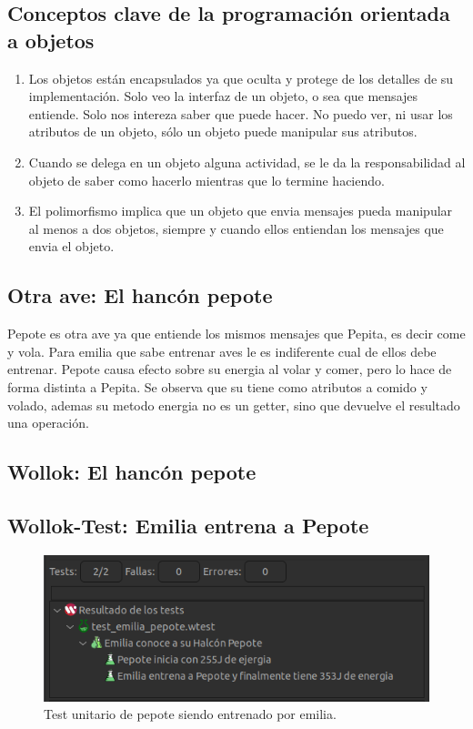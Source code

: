 \documentclass[11pt,a4paper]{article}
\begin{document}
\subsection{Conceptos clave de la programación orientada a objetos}
\begin{enumerate}
	\item Los objetos están encapsulados ya que oculta y protege de los detalles de su implementación. Solo veo la interfaz de un objeto, o sea que mensajes entiende. Solo nos intereza saber que puede hacer. No puedo ver, ni usar los atributos de un objeto, sólo un objeto puede manipular sus atributos.
	\item Cuando se delega en un objeto alguna actividad, se le da la responsabilidad al objeto de saber como hacerlo mientras que lo termine haciendo.
	\item El polimorfismo implica que un objeto que envia mensajes pueda manipular al menos a dos objetos, siempre y cuando ellos entiendan los mensajes que envia el objeto.
\end{enumerate}
\subsection{Otra ave: El hancón pepote}
Pepote es otra ave ya que entiende los mismos mensajes que Pepita, es decir come y vola. Para emilia que sabe entrenar aves le es indiferente cual de ellos debe entrenar. Pepote causa efecto sobre su energia al volar y comer, pero lo hace de forma distinta a Pepita.
Se observa que su tiene como atributos a comido y volado, ademas su metodo energia no es un getter, sino que devuelve el resultado una operación.
\subsection{Wollok: El hancón pepote}


\subsection{Wollok-Test: Emilia entrena a Pepote}


\begin{figure}[H]
	\centering
	\includegraphics[scale=0.7]{figuras/test_pepote_emilia.png}
    \caption{Test unitario de pepote siendo entrenado por emilia.}
    \label{fig:test emilia entrena a pepote}
\end{figure}  
\end{document}
